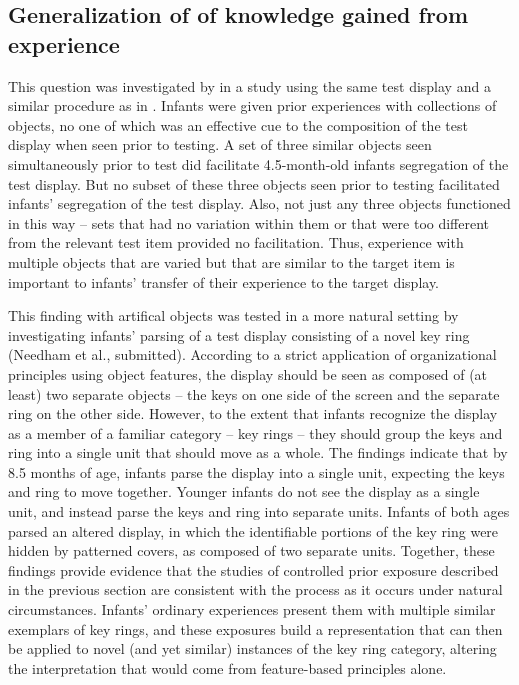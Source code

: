 %


\subsection{Generalization of of knowledge gained from experience}

This question was investigated by 
in a study using the same test display and a similar procedure as in
.  Infants were given prior experiences with collections
of objects, no one of which was an effective cue to the composition of
the test display when seen prior to testing.  A set of three similar
objects seen simultaneously prior to test did facilitate 4.5-month-old
infants segregation of the test display.  But no subset of these three
objects seen prior to testing facilitated infants' segregation of the
test display.  Also, not just any three objects functioned in this way
-- sets that had no variation within them or that were too different
from the relevant test item provided no facilitation.  Thus,
experience with multiple objects that are varied but that are similar
to the target item is important to infants' transfer of their
experience to the target display.


This finding 
with artifical objects was tested in a more natural setting
%
%
by investigating
infants' parsing of a test display consisting of a novel key
ring (Needham et al., submitted).  
%
According to a strict
application of organizational principles using object features, the
display should be seen as composed of (at least) two separate
objects -- the keys on one side of the screen and the separate
ring on the other side.  However, to the extent that infants recognize
the display as a member of a familiar category -- key
rings -- they should group the keys and ring into a single unit
that should move as a whole.  The findings indicate that by 8.5 months
of age, infants parse the display into a single unit, expecting the
keys and ring to move together.  Younger infants do not see the
display as a single unit, and instead parse the keys and ring into
separate units.  Infants of both ages parsed an altered display, in
which the identifiable portions of the key ring were hidden by
patterned covers, as composed of two separate units.  Together, these
findings provide evidence that the studies of controlled prior
exposure described in the previous section are consistent with the
process as it occurs under natural circumstances.  Infants'
ordinary experiences present them with multiple similar exemplars of
key rings, and these exposures build a representation that can then be
applied to novel (and yet similar) instances of the key ring category,
altering the interpretation that would come from feature-based
principles alone.


